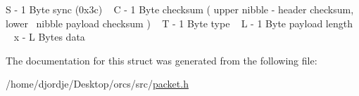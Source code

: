 S -\/ 1 Byte sync (0x3c) ~\newline
 C -\/ 1 Byte checksum ( upper nibble -\/ header checksum, lower~\newline
 nibble payload checksum ) ~\newline
 T -\/ 1 Byte type ~\newline
 L -\/ 1 Byte payload length ~\newline
 x -\/ L Bytes data 

The documentation for this struct was generated from the following file\+:\begin{DoxyCompactItemize}
\item 
/home/djordje/\+Desktop/orcs/src/\hyperlink{packet_8h}{packet.\+h}\end{DoxyCompactItemize}
